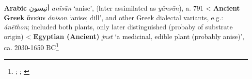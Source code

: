 \begin{etymology}\label{ety:anisun}
\textbf{Arabic} {أنيسون} \textit{anīsūn} `anise', (later assimilated as  \textit{yānsūn}), a. 791
< \textbf{Ancient Greek} {ἄνισον} \textit{ánison} `anise; dill', and other Greek dialectal variants, e.g.: \textit{ánēthon}; included both plants, only later distinguished (probaby of substrate origin)
< \textbf{Egyptian (Ancient)} \textit{jnst} `a medicinal, edible plant (probably anise)', ca. 2030-1650 BC\footnote{\textcite{wehr_dictionary_1976}; \textcite{liddell_greek-english_1940}; \textcites[99]{erman_worterbuch_1926}[240]{hemmerdinger_noms_1968}}
\end{etymology}